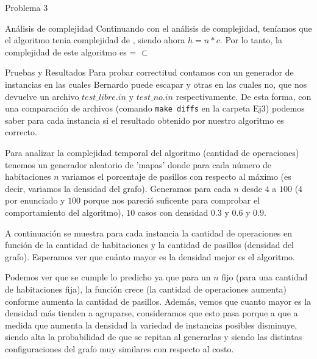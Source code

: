 \begin{section}{Problema 3}
\begin{subsection}{Análisis de complejidad}
		Continuando con el análisis de complejidad, teníamos que el algoritmo tenia complejidad de , siendo ahora $h=n*c$. Por lo tanto, la complejidad de este algoritmo es  =  $\subset$ \\
	\end{subsection}


	\begin{subsection}{Pruebas y Resultados}
		Para probar correctitud contamos con un generador de instancias en las cuales Bernardo puede escapar y otras en las cuales no, que nos devuelve un archivo $test\_libre.in$ y $test\_no.in$ respectivamente. De esta forma, con una comparación de archivos (comando \texttt{make diffs} en la carpeta Ej3) podemos saber para cada instancia si el resultado obtenido por nuestro algoritmo es correcto.

		Para analizar la complejidad temporal del algoritmo (cantidad de operaciones) tenemos un generador aleatorio de 'mapas' donde para cada número de habitaciones $n$ variamos el porcentaje de pasillos con respecto al máximo (es decir, variamos la densidad del grafo). Generamos para cada $n$ desde $4$ a $100$ ($4$ por enunciado y $100$ porque nos pareció suficente para comprobar el comportamiento del algoritmo), $10$ casos con densidad $0.3$ y $0.6$ y $0.9$.

		A continuación se muestra para cada instancia la cantidad de operaciones en función de la cantidad de habitaciones y la cantidad de pasillos (densidad del grafo). Esperamos ver que cuánto mayor es la densidad mejor es el algoritmo.
		

		Podemos ver que se cumple lo predicho ya que para un $n$ fijo (para una cantidad de habitaciones fija), la función crece (la cantidad de operaciones aumenta) conforme aumenta la cantidad de pasillos. 
		Además, vemos que cuanto mayor es la densidad más tienden a agruparse, consideramos que esto pasa porque a que a medida que aumenta la densidad la variedad de instancias posibles disminuye, siendo alta la probabilidad de que se repitan al generarlas y siendo las distintas configuraciones del grafo muy similares con respecto al costo.\VSP


\end{subsection}
\end{section}
